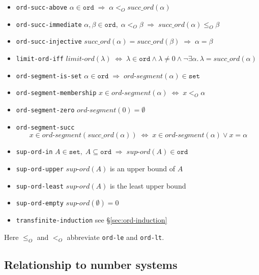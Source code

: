\begin{itemize}
\item \texttt{ord-succ-above}
  $\alpha \in \mathtt{ord} \;\Rightarrow\; \alpha <_O \mathit{succ\_ord}(\alpha)$
\item \texttt{ord-succ-immediate}
  $\alpha,\beta \in \mathtt{ord},\; \alpha <_O \beta \;\Rightarrow\; \mathit{succ\_ord}(\alpha) \leq_O \beta$
\item \texttt{ord-succ-injective}
  $\mathit{succ\_ord}(\alpha) = \mathit{succ\_ord}(\beta) \;\Rightarrow\; \alpha = \beta$
\item \begin{sloppypar}\texttt{limit-ord-iff}
  $\mathit{limit\text{-}ord}(\lambda) \;\Leftrightarrow\; \lambda \in \mathtt{ord} \land \lambda \neq 0 \land \lnot\exists\alpha.\,\lambda = \mathit{succ\_ord}(\alpha)$\end{sloppypar}
\item \texttt{ord-segment-is-set}
  $\alpha \in \mathtt{ord} \;\Rightarrow\; \mathit{ord\text{-}segment}(\alpha) \in \mathtt{set}$
\item \texttt{ord-segment-membership}
  $x \in \mathit{ord\text{-}segment}(\alpha) \;\Leftrightarrow\; x <_O \alpha$
\item \texttt{ord-segment-zero}
  $\mathit{ord\text{-}segment}(0) = \emptyset$
\item \texttt{ord-segment-succ}
  \[x \in \mathit{ord\text{-}segment}(\mathit{succ\_ord}(\alpha))
  \;\Leftrightarrow\; x \in \mathit{ord\text{-}segment}(\alpha) \lor x = \alpha\]
\item \texttt{sup-ord-in}
  $A \in \mathtt{set},\; A \subseteq \mathtt{ord} \;\Rightarrow\; \mathit{sup\text{-}ord}(A) \in \mathtt{ord}$
\item \texttt{sup-ord-upper}
  $\mathit{sup\text{-}ord}(A)$ is an upper bound of $A$
\item \texttt{sup-ord-least}
  $\mathit{sup\text{-}ord}(A)$ is the least upper bound
\item \texttt{sup-ord-empty}
  $\mathit{sup\text{-}ord}(\emptyset) = 0$
\item \texttt{transfinite-induction}
  see \S\ref{sec:ord-induction}
\end{itemize}

Here $\leq_O$ and $<_O$ abbreviate \texttt{ord-le} and \texttt{ord-lt}.

\subsection{Relationship to number systems}

